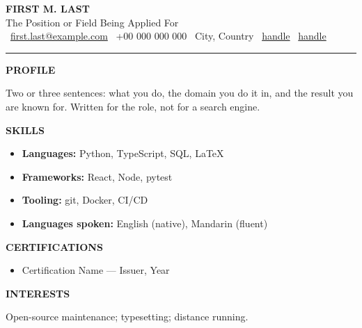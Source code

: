 \documentclass[10pt,a4paper]{article}
\newcommand{\railhead}[1]{{\color{accent}\bfseries\small\MakeUppercase{#1}}}
\newcommand{\railitem}[2]{\item \textbf{#1:} #2}
\begin{document}
\pagestyle{empty}

\begin{center}
  {\Huge\bfseries FIRST M. LAST}\\[3pt]
  {\large\color{muted} The Position or Field Being Applied For}\\[6pt]
  {\small
    \faEnvelope\ \href{mailto:first.last@example.com}{first.last@example.com}
    \quad \faPhone\ +00 000 000 000
    \quad \faMapMarker*\ City, Country
    \quad \faGithub\ \href{https://github.com/handle}{handle}
    \quad \faLinkedin\ \href{https://linkedin.com/in/handle}{handle}}
\end{center}
\vspace{4pt}
{\color{accent}\rule{\linewidth}{1.2pt}}

\noindent\begin{minipage}[t]{0.32\textwidth}
  \vspace{0pt}

  \railhead{Profile}\par\vspace{2pt}
  {\small Two or three sentences: what you do, the domain you do it in, and the
  result you are known for. Written for the role, not for a search engine.}
  \par\vspace{8pt}

  \railhead{Skills}\par\vspace{2pt}
  {\small
  \begin{itemize}
    \railitem{Languages}{Python, TypeScript, SQL, \LaTeX}
    \railitem{Frameworks}{React, Node, pytest}
    \railitem{Tooling}{git, Docker, CI/CD}
    \railitem{Languages spoken}{English (native), Mandarin (fluent)}
  \end{itemize}}
  \par\vspace{8pt}

  \railhead{Certifications}\par\vspace{2pt}
  {\small
  \begin{itemize}
    \item Certification Name --- Issuer, Year
  \end{itemize}}
  \par\vspace{8pt}

  \railhead{Interests}\par\vspace{2pt}
  {\small Open-source maintenance; typesetting; distance running.}
\end{minipage}\hfill
\end{document}
